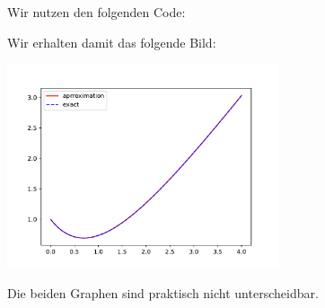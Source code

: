 \section{}

Wir nutzen den folgenden Code:



Wir erhalten damit das folgende Bild:

\begin{center}
  \includegraphics[width = 0.6\textwidth]{chapter_04/exercise_04_20_figure.pdf}
\end{center}

Die beiden Graphen sind praktisch nicht unterscheidbar.
